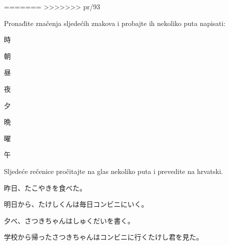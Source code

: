 
\author{Ivan Petranović}

=======
>>>>>>> pr/93
	
	\begin{mondai}{Pronađite značenja sljedećih znakova i probajte ih nekoliko puta napisati:}
		\item 時
		\item 朝
		\item 昼
		\item 夜
		\item 夕
		\item 晩
		\item 曜
		\item 午
	\end{mondai}
\begin{mondai}{Sljedeće rečenice pročitajte na glas nekoliko puta i prevedite na hrvatski.}
		\item 昨日、たこやきを食べた。
		\item 明日から、たけしくんは毎日コンビニにいく。
		\item 夕べ、さつきちゃんはしゅくだいを書く。
		\item 学校から帰ったさつきちゃんはコンビニに行くたけし君を見た。
	\end{mondai}

